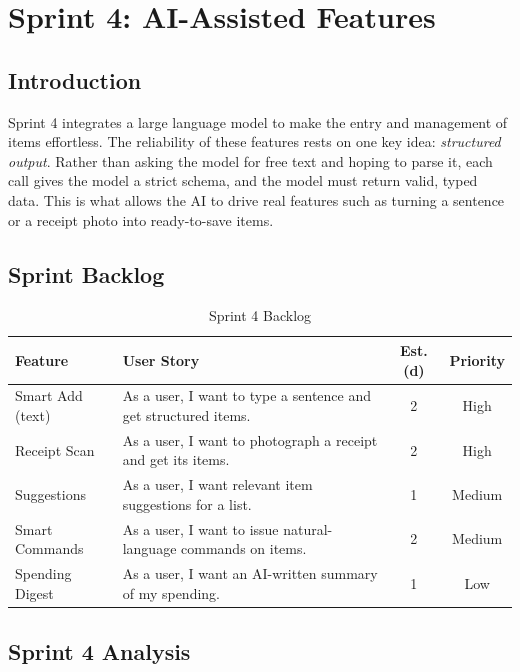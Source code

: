 \documentclass[12pt,a4paper,oneside]{report}
\begin{document}
\chapter{Sprint 4: AI-Assisted Features}

\section{Introduction}
Sprint 4 integrates a large language model to make the entry and management of
items effortless. The reliability of these features rests on one key idea:
\emph{structured output}. Rather than asking the model for free text and hoping to
parse it, each call gives the model a strict schema, and the model must return
valid, typed data. This is what allows the AI to drive real features such as
turning a sentence or a receipt photo into ready-to-save items.

\section{Sprint Backlog}
\begin{table}[H]\centering
\caption{Sprint 4 Backlog}
\renewcommand{\arraystretch}{1.3}
\begin{tabularx}{\textwidth}{|p{3.2cm}|X|c|c|}
\hline
\textbf{Feature} & \textbf{User Story} & \textbf{Est. (d)} & \textbf{Priority} \\ \hline
Smart Add (text) & As a user, I want to type a sentence and get structured items. & 2 & High \\ \hline
Receipt Scan & As a user, I want to photograph a receipt and get its items. & 2 & High \\ \hline
Suggestions & As a user, I want relevant item suggestions for a list. & 1 & Medium \\ \hline
Smart Commands & As a user, I want to issue natural-language commands on items. & 2 & Medium \\ \hline
Spending Digest & As a user, I want an AI-written summary of my spending. & 1 & Low \\ \hline
\end{tabularx}
\renewcommand{\arraystretch}{1}
\end{table}

\section{Sprint 4 Analysis}
\end{document}
